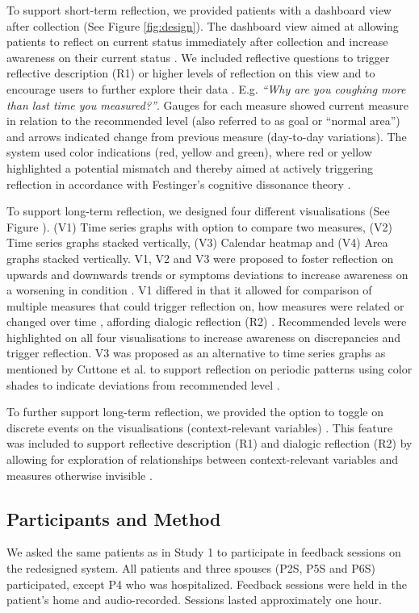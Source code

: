 To support short-term reflection, we provided patients with a dashboard view after collection (See Figure \ref{fig:design}). The dashboard view aimed at allowing patients to reflect on current status immediately after collection and increase awareness on their current status \cite{Cuttone, Muller}. We included reflective questions to trigger reflective description (R1) or higher levels of reflection on this view and to encourage users to further explore their data \cite{Fleck, Muller}. E.g. \textit{“Why are you coughing more than last time you measured?”}. Gauges for each measure showed current measure in relation to the recommended level (also referred to as goal or “normal area”) and arrows indicated change from previous measure (day-to-day variations). The system used color indications (red, yellow and green), where red or yellow highlighted a potential mismatch and thereby aimed at actively triggering reflection in accordance with Festinger’s cognitive dissonance theory \cite{Rivera}. 

To support long-term reflection, we designed four different visualisations (See Figure ). (V1) Time series graphs with option to compare two measures, (V2) Time series graphs stacked vertically, (V3) Calendar heatmap and (V4) Area graphs stacked vertically. V1, V2 and V3 were proposed to foster reflection on upwards and downwards trends or symptoms deviations to increase awareness on a worsening in condition \cite{Rivera}. V1 differed in that it allowed for comparison of multiple measures that could trigger reflection on, how measures were related or changed over time \cite{Cuttone}, affording dialogic reflection (R2) \cite{Fleck}. Recommended levels were highlighted on all four visualisations to increase awareness on discrepancies \cite{Li2010} and trigger reflection. V3 was proposed as an alternative to time series graphs as mentioned by Cuttone et al. to support reflection on periodic patterns using color shades to indicate deviations from recommended level \cite{Cuttone, Li2010}.  

To further support long-term reflection, we provided the option to toggle on discrete events on the visualisations (context-relevant variables) \cite{Sorensen}. This feature was included to support reflective description (R1) and dialogic reflection (R2) by allowing for exploration of relationships between context-relevant variables and measures otherwise invisible \cite{Fleck}.  

\subsection{Participants and Method}
We asked the same patients as in Study 1 to participate in feedback sessions on the redesigned system. All patients and three spouses (P2S, P5S and P6S) participated, except P4 who was hospitalized. Feedback sessions were held in the patient’s home and audio-recorded. Sessions lasted approximately one hour. 

